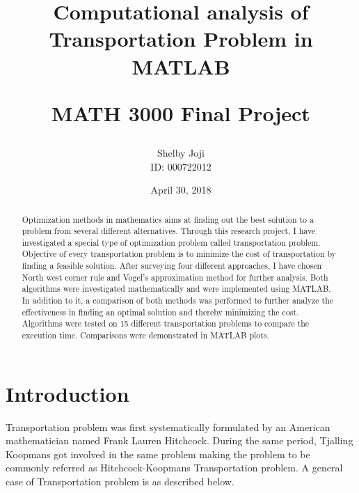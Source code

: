 \documentclass[12pt]{article}
\theoremstyle{definition}
\theoremstyle{definition}
\numberwithin{equation}{section}
\begin{document}
\title{Computational analysis of Transportation Problem in MATLAB\\
\begin{large} 
MATH 3000 Final Project
\end{large}}
\author{Shelby Joji\\ID: 000722012\\ }
\date{April 30, 2018}
\maketitle

\begin{abstract}
Optimization methods in mathematics aims at finding out the best solution to a problem from several different alternatives. Through this research project, I have investigated a special type of optimization problem called transportation problem. Objective of every transportation problem is to minimize the cost of transportation by finding a feasible solution. After surveying four different approaches, I have chosen North west corner rule and Vogel’s approximation method for further analysis. Both algorithms were investigated mathematically and were implemented using MATLAB. In addition to it, a comparison of both methods was performed to further analyze the effectiveness in finding an optimal solution and thereby minimizing the cost. Algorithms were tested on 15 different transportation problems to compare the execution time. Comparisons were demonstrated in MATLAB plots. 
\end{abstract}
\pagebreak
\section{Introduction}

Transportation problem was first systematically formulated by an American mathematician named Frank Lauren Hitchcock\cite{a1}. During the same period, Tjalling Koopmans got involved in the same problem making the problem to be commonly referred as Hitchcock-Koopmans Transportation problem\cite{a1}. A general case of Transportation problem is as described below.
\end{document}
